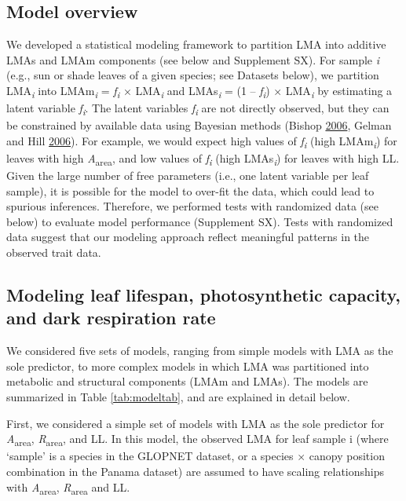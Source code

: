 \documentclass[
  12pt,
]{article}
\begin{document}
\hypertarget{model-overview}{%
\subsection{Model overview}\label{model-overview}}

We developed a statistical modeling framework to partition LMA into additive LMAs and LMAm components (see below and Supplement SX).
For sample \emph{i} (e.g., sun or shade leaves of a given species; see Datasets below), we partition LMA\textsubscript{\emph{i}} into LMAm\textsubscript{\emph{i}} = \emph{f\textsubscript{i}} × LMA\textsubscript{\emph{i}} and LMAs\textsubscript{\emph{i}} = (1 -- \emph{f\textsubscript{i}}) × LMA\textsubscript{\emph{i}} by estimating a latent variable \emph{f\textsubscript{i}}.
The latent variables \emph{f\textsubscript{i}} are not directly observed, but they can be constrained by available data using Bayesian methods (Bishop \protect\hyperlink{ref-Bishop2006}{2006}, Gelman and Hill \protect\hyperlink{ref-Gelman2006}{2006}).
For example, we would expect high values of \emph{f\textsubscript{i}} (high LMAm\textsubscript{\emph{i}}) for leaves with high \emph{A}\textsubscript{area}, and low values of \emph{f\textsubscript{i}} (high LMAs\textsubscript{\emph{i}}) for leaves with high LL.
Given the large number of free parameters (i.e., one latent variable per leaf sample), it is possible for the model to over-fit the data, which could lead to spurious inferences.
Therefore, we performed tests with randomized data (see below) to evaluate model performance (Supplement SX).
Tests with randomized data suggest that our modeling approach reflect meaningful patterns in the observed trait data.

\hypertarget{modeling-leaf-lifespan-photosynthetic-capacity-and-dark-respiration-rate}{%
\subsection{Modeling leaf lifespan, photosynthetic capacity, and dark respiration rate}\label{modeling-leaf-lifespan-photosynthetic-capacity-and-dark-respiration-rate}}

We considered five sets of models, ranging from simple models with LMA as the sole predictor, to more complex models in which LMA was partitioned into metabolic and structural components (LMAm and LMAs).
The models are summarized in Table \ref{tab:modeltab}, and are explained in detail below.

First, we considered a simple set of models with LMA as the sole predictor for \emph{A}\textsubscript{area}, \emph{R}\textsubscript{area}, and LL.
In this model, the observed LMA for leaf sample i (where `sample' is a species in the GLOPNET dataset, or a species \(\times\) canopy position combination in the Panama dataset) are assumed to have scaling relationships with \emph{A}\textsubscript{area}, \emph{R}\textsubscript{area} and LL.
\end{document}
